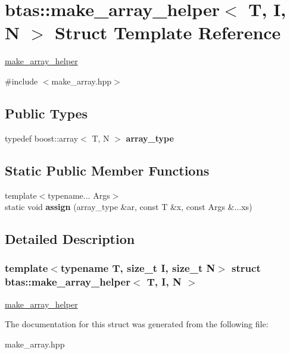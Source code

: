 \hypertarget{structbtas_1_1make__array__helper}{
\section{btas::make\_\-array\_\-helper$<$ T, I, N $>$ Struct Template Reference}
\label{structbtas_1_1make__array__helper}
}


\hyperlink{structbtas_1_1make__array__helper}{make\_\-array\_\-helper}  


{\ttfamily \#include $<$make\_\-array.hpp$>$}\subsection*{Public Types}
\begin{DoxyCompactItemize}
\item 
\hypertarget{structbtas_1_1make__array__helper_aa917edb5a4b75b82301f534142bd7cab}{
typedef boost::array$<$ T, N $>$ {\bfseries array\_\-type}}
\label{structbtas_1_1make__array__helper_aa917edb5a4b75b82301f534142bd7cab}

\end{DoxyCompactItemize}
\subsection*{Static Public Member Functions}
\begin{DoxyCompactItemize}
\item 
\hypertarget{structbtas_1_1make__array__helper_af6168fb5ab9e14051c566a0cbb7a7db8}{
{\footnotesize template$<$typename... Args$>$ }\\static void {\bfseries assign} (array\_\-type \&ar, const T \&x, const Args \&...xs)}
\label{structbtas_1_1make__array__helper_af6168fb5ab9e14051c566a0cbb7a7db8}

\end{DoxyCompactItemize}


\subsection{Detailed Description}
\subsubsection*{template$<$typename T, size\_\-t I, size\_\-t N$>$ struct btas::make\_\-array\_\-helper$<$ T, I, N $>$}

\hyperlink{structbtas_1_1make__array__helper}{make\_\-array\_\-helper} 

The documentation for this struct was generated from the following file:\begin{DoxyCompactItemize}
\item 
make\_\-array.hpp\end{DoxyCompactItemize}

